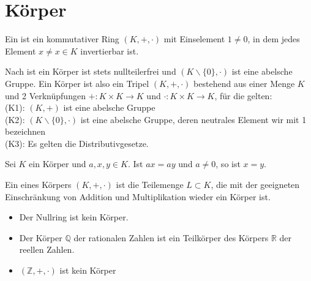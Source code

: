 \section{Körper}

\begin{definition}[Körper]
	Ein  ist ein kommutativer Ring $(K,+,\cdot)$ mit Einselement 
	$1 \neq 0$, in dem jedes Element $x \neq x \in K$ invertierbar ist.
\end{definition}

\begin{remark}
	Nach  ist ein Körper ist stets nullteilerfrei und $(K\backslash\{0\}, \cdot)$ ist eine abelsche
	Gruppe. Ein Körper ist also ein Tripel $(K,+,\cdot)$ bestehend aus einer Menge $K$ und 2 Verknüpfungen
	$+: K \times K \to K$ und $\cdot: K \times K \to K$, für die gelten: \\
	(K1): $(K,+)$ ist eine abelsche Gruppe \\
	(K2): $(K\backslash\{0\}, \cdot)$ ist eine abelsche Gruppe, deren neutrales Element wir mit 1 bezeichnen \\
	(K3): Es gelten die Distributivgesetze.
\end{remark}

\begin{remark}
	Sei $K$ ein Körper und $a,x,y \in K$. Ist $ax=ay$ und $a \neq 0$, so ist $x=y$.
\end{remark}

\begin{definition}[Teilkörper]
	Ein  eines Körpers $(K,+,\cdot)$ ist die Teilemenge $L 
	\subset K$, die mit der geeigneten Einschränkung von Addition und Multiplikation wieder ein
	Körper ist.
\end{definition}

\begin{example}
	\begin{itemize}
		\item Der Nullring ist kein Körper.
		\item Der Körper $\mathbb Q$ der rationalen Zahlen ist ein Teilkörper des Körpers $\mathbb R$ der
		reellen Zahlen.
		\item $(\mathbb Z, + ,\cdot)$ ist kein Körper
	\end{itemize}
\end{example}

